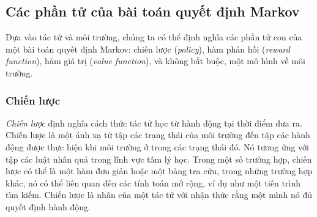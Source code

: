 \subsection{Các phần tử của bài toán quyết định Markov}
Dựa vào tác tử và môi trường, chúng ta có thể định nghĩa các phần tử con của một bài toán quyết định Markov: chiến lược (\textit{policy}), hàm phản hồi (\textit{reward function}), hàm giá trị (\textit{value function}), và không bắt buộc, một mô hình về môi trường.
\subsubsection*{Chiến lược}
\textit{Chiến lược} định nghĩa cách thức tác tử học từ hành động tại thời điểm đưa ra. Chiến lược là một ánh xạ từ tập các trạng thái của môi trường đến tập các hành động được thực hiện khi môi trường ở trong các trạng thái đó. Nó tương ứng với tập các luật nhân quả trong lĩnh vực tâm lý học. Trong một số trường hợp, chiến lược có thể là một hàm đơn giản hoặc một bảng tra cứu, trong những trường hợp khác, nó có thể liên quan đến các tính toán mở rộng, ví dụ như một tiến trình tìm kiếm. Chiến lược là nhân của một tác tử với nhận thức rằng một mình nó đủ quyết định hành động.
\newpage
